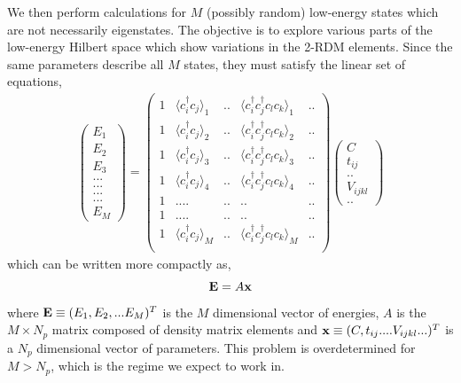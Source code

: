 \documentclass[prl,12pt,onecolumn,nofootinbib,notitlepage,english,superscriptaddress]{revtex4-1}
\begin{document}
We then perform calculations for 
$M$ (possibly random) low-energy states which are not necessarily eigenstates.  
The objective is to explore various parts 
of the low-energy Hilbert space which show variations in the 2-RDM elements. 
Since the same parameters describe all $M$ states, they must 
satisfy the linear set of equations, 
\begin{eqnarray}
\left(
\begin{array}{c}
E_1 \\
E_2 \\
E_3 \\
... \\
... \\
... \\
... \\
E_M
\end{array}
\right) =
\left(
\begin{array}{ccccc}
1 & \langle c_i^{\dagger}c_j \rangle_{1}  & .. & \langle c_i^{\dagger}c_j^{\dagger}c_l c_k \rangle_{1} & .. \\
1 & \langle c_i^{\dagger}c_j \rangle_{2}  & .. & \langle c_i^{\dagger}c_j^{\dagger}c_l c_k \rangle_{2} & .. \\
1 & \langle c_i^{\dagger}c_j \rangle_{3}  & .. & \langle c_i^{\dagger}c_j^{\dagger}c_l c_k \rangle_{3} & .. \\
1 & \langle c_i^{\dagger}c_j \rangle_{4}  & .. & \langle c_i^{\dagger}c_j^{\dagger}c_l c_k \rangle_{4} & .. \\
1 & ....                                  & .. & ..                                                    & .. \\
1 & ....                                  & .. & ..                                                    & .. \\
1 & \langle c_i^{\dagger}c_j \rangle_{M}  & .. & \langle c_i^{\dagger}c_j^{\dagger}c_l c_k \rangle_{M} & .. \\
\end{array}
\right) \left(
\begin{array}{c}
C           \\
t_{ij}      \\
..          \\
V_{ijkl}    \\
..
\end{array}
\right)
\end{eqnarray}
which can be written more compactly as,
\begin{equation}
	{\bf{E}} = A {\bf{x}}
\end{equation}
where $ {\bf{E}} \equiv (E_1,E_2,...E_M)^{T}$ 
is the $M$ dimensional vector of energies, $A$ is the $M \times N_p$ matrix composed 
of density matrix elements and $ {\bf{x}} \equiv (C,t_{ij}....V_{ijkl}...)^T$ 
is a $N_p$ dimensional vector of parameters.
This problem is overdetermined for $M>N_p$, which is the regime we expect to work in.
\end{document}
